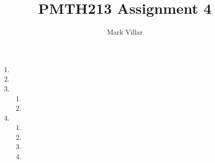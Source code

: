 \documentclass[12pt]{amsart}
\title{PMTH213 \hfill Assignment 4}
\author{Mark Villar}
\begin{document}
 

\maketitle 

\begin{enumerate}
	
	\item
			
	\item 
		
	\item 
		\begin{enumerate}
			\item

			\item
		\end{enumerate}

	\item
		\begin{enumerate}
			\item

			\item

			\item

			\item
		\end{enumerate}

\end{enumerate}
\end{document}
